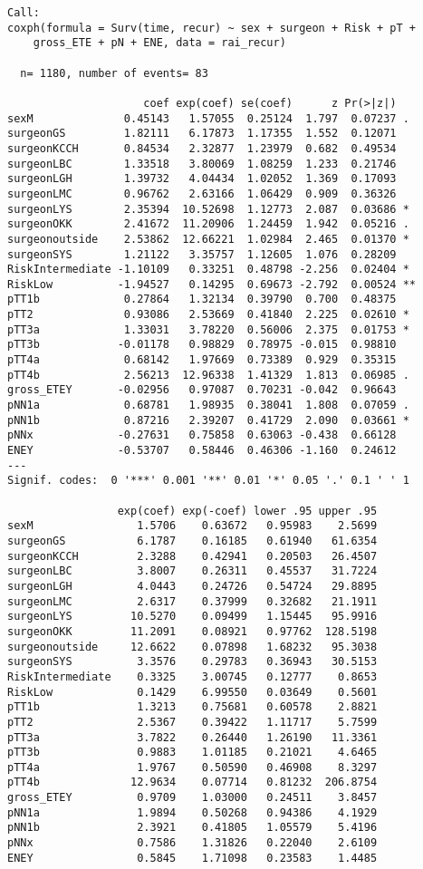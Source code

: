 \documentclass[
  letterpaper,
  DIV=11,
  numbers=noendperiod]{scrartcl}
\begin{document}
\begin{verbatim}
Call:
coxph(formula = Surv(time, recur) ~ sex + surgeon + Risk + pT + 
    gross_ETE + pN + ENE, data = rai_recur)

  n= 1180, number of events= 83 

                     coef exp(coef) se(coef)      z Pr(>|z|)   
sexM              0.45143   1.57055  0.25124  1.797  0.07237 . 
surgeonGS         1.82111   6.17873  1.17355  1.552  0.12071   
surgeonKCCH       0.84534   2.32877  1.23979  0.682  0.49534   
surgeonLBC        1.33518   3.80069  1.08259  1.233  0.21746   
surgeonLGH        1.39732   4.04434  1.02052  1.369  0.17093   
surgeonLMC        0.96762   2.63166  1.06429  0.909  0.36326   
surgeonLYS        2.35394  10.52698  1.12773  2.087  0.03686 * 
surgeonOKK        2.41672  11.20906  1.24459  1.942  0.05216 . 
surgeonoutside    2.53862  12.66221  1.02984  2.465  0.01370 * 
surgeonSYS        1.21122   3.35757  1.12605  1.076  0.28209   
RiskIntermediate -1.10109   0.33251  0.48798 -2.256  0.02404 * 
RiskLow          -1.94527   0.14295  0.69673 -2.792  0.00524 **
pTT1b             0.27864   1.32134  0.39790  0.700  0.48375   
pTT2              0.93086   2.53669  0.41840  2.225  0.02610 * 
pTT3a             1.33031   3.78220  0.56006  2.375  0.01753 * 
pTT3b            -0.01178   0.98829  0.78975 -0.015  0.98810   
pTT4a             0.68142   1.97669  0.73389  0.929  0.35315   
pTT4b             2.56213  12.96338  1.41329  1.813  0.06985 . 
gross_ETEY       -0.02956   0.97087  0.70231 -0.042  0.96643   
pNN1a             0.68781   1.98935  0.38041  1.808  0.07059 . 
pNN1b             0.87216   2.39207  0.41729  2.090  0.03661 * 
pNNx             -0.27631   0.75858  0.63063 -0.438  0.66128   
ENEY             -0.53707   0.58446  0.46306 -1.160  0.24612   
---
Signif. codes:  0 '***' 0.001 '**' 0.01 '*' 0.05 '.' 0.1 ' ' 1

                 exp(coef) exp(-coef) lower .95 upper .95
sexM                1.5706    0.63672   0.95983    2.5699
surgeonGS           6.1787    0.16185   0.61940   61.6354
surgeonKCCH         2.3288    0.42941   0.20503   26.4507
surgeonLBC          3.8007    0.26311   0.45537   31.7224
surgeonLGH          4.0443    0.24726   0.54724   29.8895
surgeonLMC          2.6317    0.37999   0.32682   21.1911
surgeonLYS         10.5270    0.09499   1.15445   95.9916
surgeonOKK         11.2091    0.08921   0.97762  128.5198
surgeonoutside     12.6622    0.07898   1.68232   95.3038
surgeonSYS          3.3576    0.29783   0.36943   30.5153
RiskIntermediate    0.3325    3.00745   0.12777    0.8653
RiskLow             0.1429    6.99550   0.03649    0.5601
pTT1b               1.3213    0.75681   0.60578    2.8821
pTT2                2.5367    0.39422   1.11717    5.7599
pTT3a               3.7822    0.26440   1.26190   11.3361
pTT3b               0.9883    1.01185   0.21021    4.6465
pTT4a               1.9767    0.50590   0.46908    8.3297
pTT4b              12.9634    0.07714   0.81232  206.8754
gross_ETEY          0.9709    1.03000   0.24511    3.8457
pNN1a               1.9894    0.50268   0.94386    4.1929
pNN1b               2.3921    0.41805   1.05579    5.4196
pNNx                0.7586    1.31826   0.22040    2.6109
ENEY                0.5845    1.71098   0.23583    1.4485


\end{verbatim}
\end{document}
